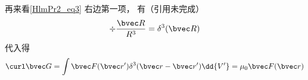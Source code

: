 再来看\autoref{HlmPr2_eq3} 右边第一项， 有（引用未完成）
\begin{equation}
\div \frac{\bvec R}{R^3} = \delta^3(\bvec R)
\end{equation}
代入得
\begin{equation}
\curl \bvec G = \int \bvec F(\bvec r') \delta^3(\bvec r - \bvec r') \dd{V'} = \mu_0 \bvec F(\bvec r)
\end{equation}
